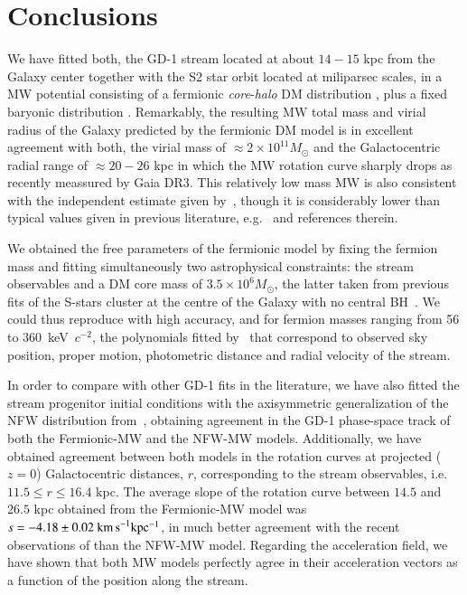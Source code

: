 \documentclass[twocolumn]{aa}
\begin{document}
\section{Conclusions}
\label{sec:conclusions}
We have fitted both, the GD-1 stream located at about $14-15$ kpc from the Galaxy center together with the S2 star orbit located at miliparsec scales, in a MW potential consisting of a fermionic \textit{core}-\textit{halo} DM distribution \citep{arguelles_novel_2018,2020A&A...641A..34B,2021MNRAS.505L..64B,2022MNRAS.511L..35A}, plus a fixed baryonic distribution \citep{2017A&A...598A..66P}. Remarkably, the resulting MW total mass and virial radius of the Galaxy predicted by the fermionic DM model is in excellent agreement with both, the virial mass of $\approx 2\times 10^{11} M_\odot$ and the Galactocentric radial range of $\approx 20-26$ kpc in which the MW rotation curve sharply drops as recently meassured by Gaia DR3. This relatively low mass MW is also consistent with the independent estimate given by~\cite{2014MNRAS.445.3788G}, though it is considerably lower than typical values given in previous literature, e.g.~\cite{2010MNRAS.406..264W} and references therein.

We obtained the free parameters of the fermionic model by fixing the fermion mass and fitting simultaneously two astrophysical constraints: the stream observables and a
DM core mass of $3.5\times10^6M_\odot$, the latter taken from previous fits of the S-stars cluster at
the centre of the Galaxy with no central BH~\citep{2020A&A...641A..34B,2021MNRAS.505L..64B}. We could thus reproduce with high accuracy, and for fermion masses ranging from 56 to 360~keV~$c^{-2}$, the polynomials fitted by~\citet{Ibata_2020} that correspond to observed sky position, proper motion, photometric distance and radial velocity of the stream.

In order to compare with other GD-1 fits in the literature, we have also fitted the stream progenitor initial conditions with the  axisymmetric generalization of the NFW distribution from~\citet{2019MNRAS.486.2995M}, obtaining agreement in the GD-1 phase-space track of
both the Fermionic-MW and the NFW-MW models. Additionally, we have obtained agreement between both models in the rotation curves at projected ($z=0$) Galactocentric distances, $r$, corresponding to the stream observables, i.e. $11.5\leq r \leq 16.4$ kpc. The average slope of the rotation curve between $14.5$ and $26.5$ kpc obtained from the Fermionic-MW model was $s=-4.18 \pm 0.02~\rm{km\, s}^{-1} kpc^{-1}$, in much better agreement with the recent observations of \cite{Jiao2023} than the NFW-MW model. Regarding the acceleration field, we have shown that both MW models perfectly agree in their acceleration vectors as a function of the position along the stream.
\end{document}
